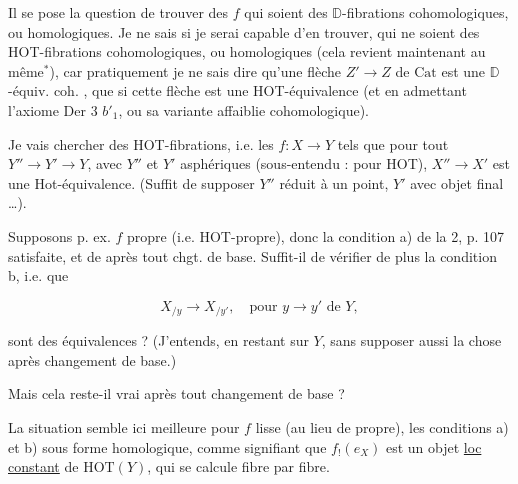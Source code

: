 

Il se pose la question de trouver des $f$ qui soient des $\mathbb D$-fibrations cohomologiques, ou homologiques. Je ne sais si je serai capable d'en trouver, qui ne soient  des HOT-fibrations cohomologiques, ou homologiques (cela revient maintenant au même$^*$), car pratiquement je ne sais  dire qu'une flèche $Z'\to Z$ de $\mathrm{Cat}$ est une $\mathbb D$-équiv. coh. , que si cette flèche est une HOT-équivalence (et en admettant l'axiome Der 3 $b'_1$, ou sa variante affaiblie cohomologique).


Je vais  chercher des HOT-fibrations, i.e. les $f:X\to Y$ tels que pour tout $Y''\to Y'\to Y$, avec $Y''$ et $Y'$  asphériques (sous-entendu : pour HOT), $X''\to X'$ est une Hot-équivalence. \unsure{[}(Suffit \unsure{$=$} de supposer $Y''$ réduit à un point, $Y'$ avec objet final \ldots{}).

Supposons p. ex. $f$ propre (i.e. HOT-propre),  donc la condition a) de la  2, p. 107 satisfaite, et de \unsure{$=$} après tout chgt. de base. Suffit-il de vérifier de plus la condition b, i.e. que

\[
X_{/y}\longrightarrow X_{/y'},\quad \text{pour }y\to y'\text{ de }Y,
\]

sont des équivalences ? (J'entends, en restant sur $Y$, sans supposer aussi  la \unsure{$=$} chose après changement de base.)




Mais cela reste-il vrai après tout changement de base ?

La situation semble ici meilleure pour $f$ lisse (au lieu de propre),   les conditions a) et b) sous forme homologique, comme signifiant que $f_!(e_X)$ est un objet \uline{loc constant} de $\mathrm{HOT}(Y)$, qui se calcule fibre par fibre.


